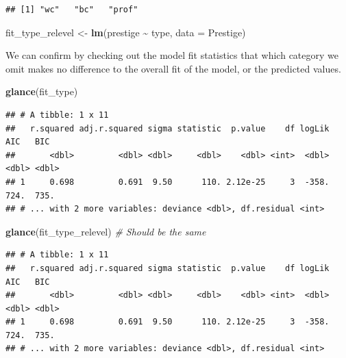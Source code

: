 \documentclass[
  12pt,
  oneside,openany]{book}
\newenvironment{Shaded}{\begin{snugshade}}{\end{snugshade}}
\newcommand{\CommentTok}[1]{\textcolor[rgb]{0.56,0.35,0.01}{\textit{#1}}}
\newcommand{\DataTypeTok}[1]{\textcolor[rgb]{0.13,0.29,0.53}{#1}}
\newcommand{\KeywordTok}[1]{\textcolor[rgb]{0.13,0.29,0.53}{\textbf{#1}}}
\newcommand{\NormalTok}[1]{#1}
\newcommand{\OperatorTok}[1]{\textcolor[rgb]{0.81,0.36,0.00}{\textbf{#1}}}
\newcommand{\StringTok}[1]{\textcolor[rgb]{0.31,0.60,0.02}{#1}}
\begin{document}
\begin{Shaded}
\end{Shaded}

\begin{verbatim}
## [1] "wc"   "bc"   "prof"
\end{verbatim}

\begin{Shaded}
\begin{Highlighting}[]
\NormalTok{fit\_type\_relevel <{-}}\StringTok{ }\KeywordTok{lm}\NormalTok{(prestige }\OperatorTok{\textasciitilde{}}\StringTok{ }\NormalTok{type, }\DataTypeTok{data =}\NormalTok{ Prestige)}
\end{Highlighting}
\end{Shaded}

We can confirm by checking out the model fit statistics that which category we omit makes no difference to the overall fit of the model, or the predicted values.

\begin{Shaded}
\begin{Highlighting}[]
\KeywordTok{glance}\NormalTok{(fit\_type)}
\end{Highlighting}
\end{Shaded}

\begin{verbatim}
## # A tibble: 1 x 11
##   r.squared adj.r.squared sigma statistic  p.value    df logLik   AIC   BIC
##       <dbl>         <dbl> <dbl>     <dbl>    <dbl> <int>  <dbl> <dbl> <dbl>
## 1     0.698         0.691  9.50      110. 2.12e-25     3  -358.  724.  735.
## # ... with 2 more variables: deviance <dbl>, df.residual <int>
\end{verbatim}

\begin{Shaded}
\begin{Highlighting}[]
\KeywordTok{glance}\NormalTok{(fit\_type\_relevel)  }\CommentTok{\# Should be the same}
\end{Highlighting}
\end{Shaded}

\begin{verbatim}
## # A tibble: 1 x 11
##   r.squared adj.r.squared sigma statistic  p.value    df logLik   AIC   BIC
##       <dbl>         <dbl> <dbl>     <dbl>    <dbl> <int>  <dbl> <dbl> <dbl>
## 1     0.698         0.691  9.50      110. 2.12e-25     3  -358.  724.  735.
## # ... with 2 more variables: deviance <dbl>, df.residual <int>
\end{verbatim}
\end{document}
